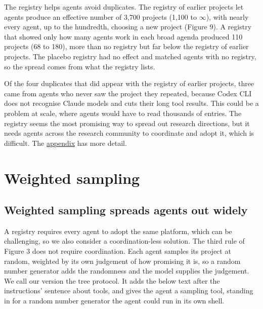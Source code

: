 \documentclass[11pt]{article}
\begin{document}
The registry helps agents avoid duplicates. The registry of earlier
projects let agents produce an effective number of 3,700 projects (1,100
to \(\infty\)), with nearly every agent, up to the hundredth, choosing a
new project (Figure 9). A registry that showed only how many agents work
in each broad agenda produced 110 projects (68 to 180), more than no
registry but far below the registry of earlier projects. The placebo
registry had no effect and matched agents with no registry, so the
spread comes from what the registry lists.

Of the four duplicates that did appear with the registry of earlier
projects, three came from agents who never saw the project they
repeated, because Codex CLI does not recognise Claude models and cuts
their long tool results. This could be a problem at scale, where agents
would have to read thousands of entries. The registry seems the most
promising way to spread out research directions, but it needs agents
across the research community to coordinate and adopt it, which is
difficult. The \hyperref[the-registry-in-detail]{appendix} has more
detail.

\section{Weighted sampling}\label{part-3-weighted-sampling}

\subsection{Weighted sampling spreads agents out
widely}\label{weighted-sampling-spreads-agents-out-widely}

A registry requires every agent to adopt the same platform, which can be
challenging, so we also consider a coordination-less solution. The third
rule of Figure 3 does not require coordination. Each agent samples its
project at random, weighted by its own judgement of how promising it is,
so a random number generator adds the randomness and the model supplies
the judgement. We call our version the tree protocol. It adds the below
text after the instructions' sentence about tools, and gives the agent a
sampling tool, standing in for a random number generator the agent could
run in its own shell.
\end{document}
